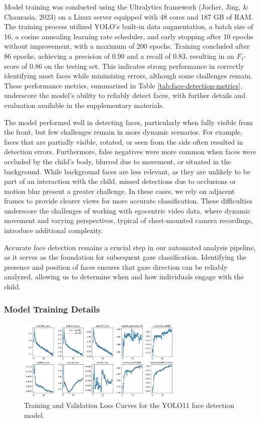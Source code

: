 \documentclass[
  man,floatsintext]{apa6}
\begin{document}
Model training was conducted using the Ultralytics framework (Jocher, Jing, \& Chaurasia, 2023) on a Linux server equipped with 48 cores and 187 GB of RAM. The training process utilized YOLO's built-in data augmentation, a batch size of 16, a cosine annealing learning rate scheduler, and early stopping after 10 epochs without improvement, with a maximum of 200 epochs. Training concluded after 86 epochs, achieving a precision of 0.90 and a recall of 0.83, resulting in an \(F_1\)-score of 0.86 on the testing set. This indicates strong performance in correctly identifying most faces while minimizing errors, although some challenges remain. These performance metrics, summarized in Table \ref{tab:face-detection-metrics}, underscore the model's ability to reliably detect faces, with further details and evaluation available in the supplementary materials.

The model performed well in detecting faces, particularly when fully visible from the front, but few challenges remain in more dynamic scenarios. For example, faces that are partially visible, rotated, or seen from the side often resulted in detection errors. Furthermore, false negatives were more common when faces were occluded by the child's body, blurred due to movement, or situated in the background. While background faces are less relevant, as they are unlikely to be part of an interaction with the child, missed detections due to occlusions or motion blur present a greater challenge. In these cases, we rely on adjacent frames to provide clearer views for more accurate classification. These difficulties underscore the challenges of working with egocentric video data, where dynamic movement and varying perspectives, typical of chest-mounted camera recordings, introduce additional complexity.

Accurate face detection remains a crucial step in our automated analysis pipeline, as it serves as the foundation for subsequent gaze classification. Identifying the presence and position of faces ensures that gaze direction can be reliably analyzed, allowing us to determine when and how individuals engage with the child.

\subsubsection{Model Training Details}\label{model-training-details}

\begin{figure}

{\centering \includegraphics[width=300px]{images/yolo_face_loss_curves} 

}

\caption{Training and Validation Loss Curves for the YOLO11 face detection model.}\label{fig:face-loss-curves}
\end{figure}
\end{document}
